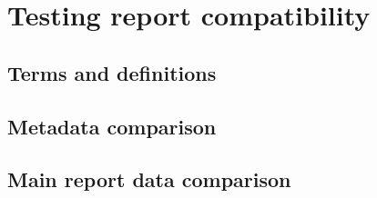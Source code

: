 \chapter{Testing report compatibility}

\section{Terms and definitions}

\section{Metadata comparison}

\section{Main report data comparison}
